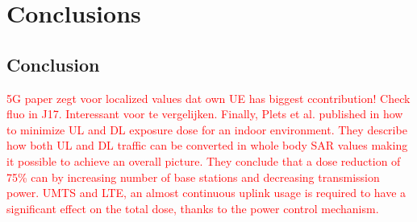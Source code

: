 \chapter{Conclusions}
\label{chap:conclusions}

\section{Conclusion}
\textcolor{red}{5G paper zegt voor localized values dat own UE has biggest ccontribution! Check fluo in J17. Interessant voor te vergelijken.}
\textcolor{red}{Finally, Plets et al. published in \cite{J22_plets2015joint} how 
to minimize \gls{UL} and \gls{DL} exposure dose for an indoor environment. They describe how both \gls{UL} and \gls{DL} traffic 
can be converted in whole body SAR values making it possible to achieve an overall picture.
They conclude that a dose reduction of 75\% can by increasing number of base stations and decreasing transmission power.
UMTS and LTE, an almost continuous
uplink usage is required to have a significant effect on the total dose, thanks to the power control mechanism.}

